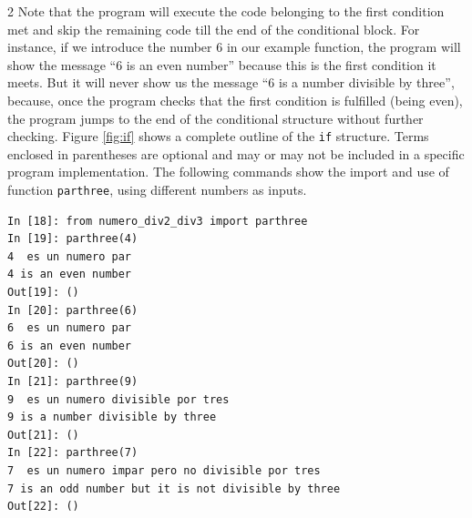 \begin{paracol}{2}
Note that the program will execute the code belonging to the first condition met and skip the remaining code till the end of the conditional block. For instance, if we introduce the number $6$ in our example function, the program will show the message ``6 is an even number'' because this is the first condition it meets. But it will never show us the message ``6 is a number divisible by three'', because, once the program checks that the first condition is fulfilled (being even), the program jumps to the end of the conditional structure without further checking.  Figure \ref{fig:if} shows a complete outline of the \texttt{if} structure. Terms enclosed in parentheses are optional and may or may not be included in a specific program implementation. The following commands show the import and use of function \texttt{parthree}, using different numbers as inputs.
\end{paracol}

\begin{center}
    \begin{minipage}{.5\textwidth}
\begin{verbatim}
In [18]: from numero_div2_div3 import parthree
In [19]: parthree(4)
4  es un numero par
4 is an even number
Out[19]: ()
In [20]: parthree(6)
6  es un numero par
6 is an even number
Out[20]: ()
In [21]: parthree(9)
9  es un numero divisible por tres
9 is a number divisible by three
Out[21]: ()
In [22]: parthree(7)
7  es un numero impar pero no divisible por tres
7 is an odd number but it is not divisible by three
Out[22]: ()
\end{verbatim}
\end{minipage}
\end{center}

